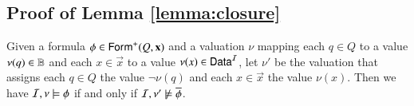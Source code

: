 \documentclass[10pt]{llncs}
\begin{document}
 

\appendix

\subsection*{Proof of Lemma \ref{lemma:closure}}

\begin{proposition}\label{prop:overline}
  Given a formula $\phi \in \mathsf{Form}^+(Q,\mathbf x)$ and a valuation $\nu$
  mapping each $q \in Q$ to a value $\nu(q) \in \mathbb{B}$ and each $x \in
  \vec{x}$ to a value $\nu(x) \in \mathsf{Data}^{\mathcal{I}}$, let $\nu'$ be the
  valuation that assigns each $q \in Q$ the value $\neg\nu(q)$ and
  each $x \in \vec{x}$ the value $\nu(x)$. Then we have 
  $\mathcal{I},\nu \models \phi$ if and only if $\mathcal{I},\nu' \not\models \overline{\phi}$. 
\end{proposition}
\end{document}
